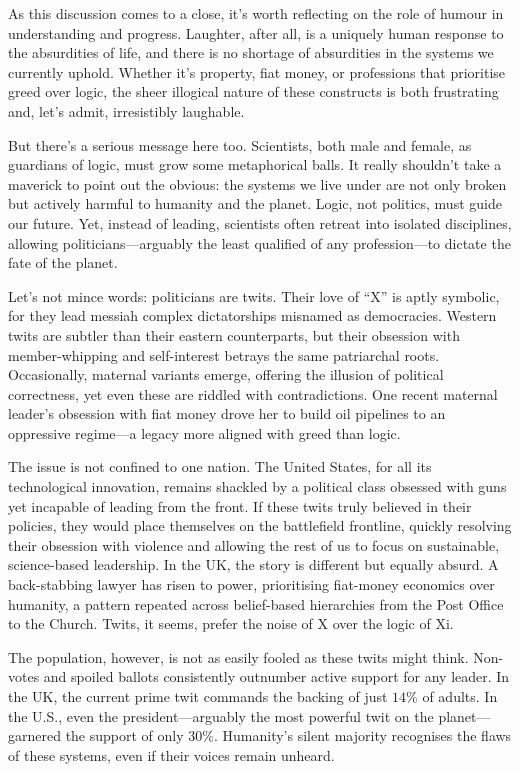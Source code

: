 \documentclass[12pt]{article}
\begin{document}
As this discussion comes to a close, it’s worth reflecting on the role of humour in understanding and progress. Laughter, after all, is a uniquely human response to the absurdities of life, and there is no shortage of absurdities in the systems we currently uphold. Whether it’s property, fiat money, or professions that prioritise greed over logic, the sheer illogical nature of these constructs is both frustrating and, let’s admit, irresistibly laughable.

But there’s a serious message here too. Scientists, both male and female, as guardians of logic, must grow some metaphorical balls. It really shouldn’t take a maverick to point out the obvious: the systems we live under are not only broken but actively harmful to humanity and the planet. Logic, not politics, must guide our future. Yet, instead of leading, scientists often retreat into isolated disciplines, allowing politicians—arguably the least qualified of any profession—to dictate the fate of the planet.

Let’s not mince words: politicians are twits. Their love of “X” is aptly symbolic, for they lead messiah complex dictatorships misnamed as democracies. Western twits are subtler than their eastern counterparts, but their obsession with member-whipping and self-interest betrays the same patriarchal roots. Occasionally, maternal variants emerge, offering the illusion of political correctness, yet even these are riddled with contradictions. One recent maternal leader’s obsession with fiat money drove her to build oil pipelines to an oppressive regime—a legacy more aligned with greed than logic.

The issue is not confined to one nation. The United States, for all its technological innovation, remains shackled by a political class obsessed with guns yet incapable of leading from the front. If these twits truly believed in their policies, they would place themselves on the battlefield frontline, quickly resolving their obsession with violence and allowing the rest of us to focus on sustainable, science-based leadership. In the UK, the story is different but equally absurd. A back-stabbing lawyer has risen to power, prioritising fiat-money economics over humanity, a pattern repeated across belief-based hierarchies from the Post Office to the Church. Twits, it seems, prefer the noise of X over the logic of Xi.

The population, however, is not as easily fooled as these twits might think. Non-votes and spoiled ballots consistently outnumber active support for any leader. In the UK, the current prime twit commands the backing of just \(14\%\) of adults. In the U.S., even the president—arguably the most powerful twit on the planet—garnered the support of only \(30\%\). Humanity’s silent majority recognises the flaws of these systems, even if their voices remain unheard.
\end{document}

